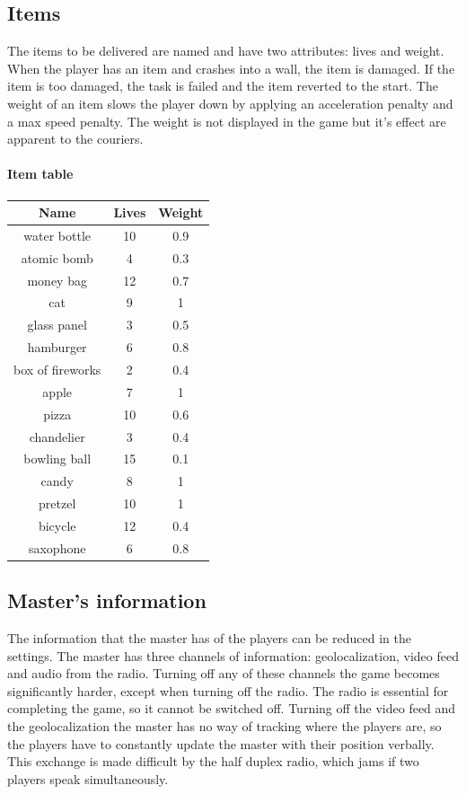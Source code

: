 \documentclass[12pt]{article}
\begin{document}
\subsection{Items}
The items to be delivered are named and have two attributes: lives and weight. When the player has an item and crashes into a wall, the item is damaged. If the item is too damaged, the task is failed and the item reverted to the start. The weight of an item slows the player down by applying an acceleration penalty and a max speed penalty. The weight is not displayed in the game but it's effect are apparent to the couriers.

\paragraph{Item table}

\begin{center}
\begin{tabular}{ |c|c|c| } 
 \hline
 Name & Lives & Weight \\ 
\hline
water bottle & 10 & 0.9\\
atomic bomb & 4 & 0.3\\
money bag & 12 & 0.7\\
cat & 9 & 1\\
glass panel & 3 & 0.5\\
hamburger & 6 & 0.8\\
box of fireworks & 2 & 0.4\\
apple & 7 & 1\\
pizza & 10 & 0.6\\
chandelier & 3 & 0.4\\
bowling ball & 15 & 0.1\\
candy & 8 & 1\\
pretzel & 10 & 1\\
bicycle & 12 & 0.4\\
saxophone & 6 & 0.8\\
 \hline
\end{tabular}
\end{center}

\subsection{Master's information}
The information that the master has of the players can be reduced in the settings. The master has three channels of information: geolocalization, video feed and audio from the radio. Turning off any of these channels the game becomes significantly harder, except when turning off the radio. The radio is essential for completing the game, so it cannot be switched off. Turning off the video feed and the geolocalization the master has no way of tracking where the players are, so the players have to constantly update the master with their position verbally. This exchange is made difficult by the half duplex radio, which jams if two players speak simultaneously.
\end{document}

